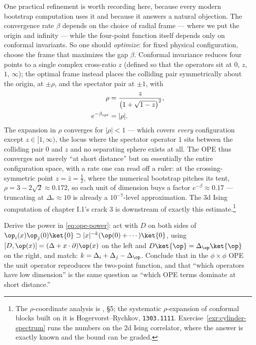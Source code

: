 One practical refinement is worth recording here, because every modern
bootstrap computation uses it and because it answers a natural objection.
The convergence rate $\beta$ depends on the choice
of radial frame --- where we put the origin and infinity --- while the
four-point function itself depends only on conformal invariants. So one
should \emph{optimize}: for fixed physical configuration, choose the frame
that maximizes the gap $\beta$. Conformal invariance reduces four points to a
single complex cross-ratio $z$ (defined so that the operators sit at $0$,
$z$, $1$, $\infty$); the optimal frame instead places the colliding pair
symmetrically about the origin, at $\pm\rho$, and the spectator pair at
$\pm 1$, with
\begin{equation}
\begin{aligned}
\rho &= \frac{z}{\left(1 + \sqrt{1 - z}\right)^2},\\
e^{-\beta_{\rm opt}} &= |\rho| .
\end{aligned}
\label{eq:rho-coordinate}
\end{equation}
The expansion in $\rho$ converges for $|\rho| < 1$ --- which covers
\emph{every} configuration except $z \in [1, \infty)$, the locus where the
spectator operator $1$ sits between the colliding pair $0$ and $z$ and no
separating sphere exists at all. The OPE thus converges not merely ``at short
distance'' but on essentially the entire configuration space, with a rate one
can read off a ruler: at the crossing-symmetric point $z = \bar z = \frac12$,
where the numerical bootstrap pitches its tent, $\rho = 3 - 2\sqrt2 \approx
0.172$, so each unit of dimension buys a factor $e^{-\beta} \approx 0.17$ ---
truncating at $\Delta_* \approx 10$ is already a $10^{-7}$-level
approximation. The 3d Ising computation of chapter I.1's crack 3 is
downstream of exactly this estimate.\footnote{The $\rho$-coordinate analysis
is , \S5; the systematic $\rho$-expansion of conformal
blocks built on it is Hogervorst--Rychkov, \texttt{1303.1111}.
Exercise~\ref{exr:cylinder-spectrum} runs the numbers on the 2d Ising
correlator, where the answer is exactly known and the bound can be graded.}

\begin{exercise}[easy]
\label{exr:ope-power}
Derive the power in \eqref{eq:ope-power}: act with $D$ on both sides of
$\op_i(x)\op_j(0)\ket{0} \supset |x|^{-k}(\op(0) + \cdots)\ket{0}$, using
$[D, \op(x)] = (\Delta + x\cdot\partial)\op(x)$ on the left and
$D\ket{\op} = \Delta_\op\ket{\op}$ on the right, and match: $k = \Delta_i +
\Delta_j - \Delta_\op$. Conclude that in the $\phi\times\phi$ OPE the unit
operator reproduces the two-point function, and that ``which operators have
low dimension'' is the same question as ``which OPE terms dominate at short
distance.''
\end{exercise}

